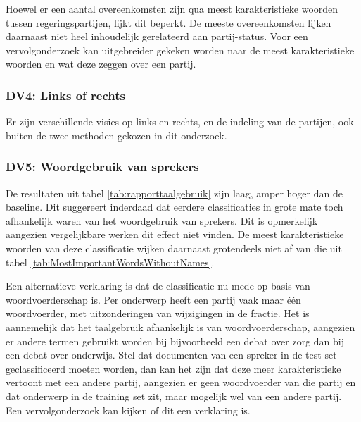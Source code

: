 Hoewel er een aantal overeenkomsten zijn qua meest karakteristieke woorden tussen regeringspartijen, lijkt dit beperkt. De meeste overeenkomsten lijken daarnaast niet heel inhoudelijk gerelateerd aan partij-status. Voor een vervolgonderzoek kan uitgebreider gekeken worden naar de meest karakteristieke woorden en wat deze zeggen over een partij.\par

\subsubsection{DV4: Links of rechts}
Er zijn verschillende visies op links en rechts, en de indeling van de partijen, ook buiten de twee methoden gekozen in dit onderzoek.\par

\subsubsection{DV5: Woordgebruik van sprekers}
De resultaten uit tabel \ref{tab:rapporttaalgebruik} zijn laag, amper hoger dan de baseline. Dit suggereert inderdaad dat eerdere classificaties in grote mate toch afhankelijk waren van het woordgebruik van sprekers. Dit is opmerkelijk aangezien vergelijkbare werken dit effect niet vinden. De meest karakteristieke woorden van deze classificatie wijken daarnaast grotendeels niet af van die uit tabel \ref{tab:MostImportantWordsWithoutNames}.\par
Een alternatieve verklaring is dat de classificatie nu mede op basis van woordvoerderschap is. Per onderwerp heeft een partij vaak maar één woordvoerder, met uitzonderingen van wijzigingen in de fractie. Het is aannemelijk dat het taalgebruik afhankelijk is van woordvoerderschap, aangezien er andere termen gebruikt worden bij bijvoorbeeld een debat over zorg dan bij een debat over onderwijs. Stel dat documenten van een spreker in de test set geclassificeerd moeten worden, dan kan het zijn dat deze meer karakteristieke vertoont met een andere partij, aangezien er geen woordvoerder van die partij en dat onderwerp in de training set zit, maar mogelijk wel van een andere partij. Een vervolgonderzoek kan kijken of dit een verklaring is. \par

